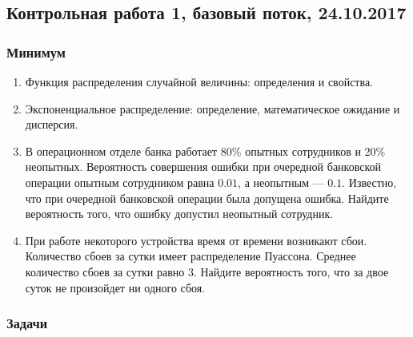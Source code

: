 \subsection{Контрольная работа 1, базовый поток, 24.10.2017}

\subsubsection*{Минимум}

\begin{enumerate}
\item Функция распределения случайной величины: определения и свойства.
\item Экспоненциальное распределение: определение, математическое ожидание и дисперсия.
\item В операционном отделе банка работает 80\% опытных сотрудников и 20\% неопытных. Вероятность совершения ошибки при очередной банковской операции опытным сотрудником равна $0.01$, а неопытным — $0.1$. Известно, что при очередной банковской операции была допущена ошибка. Найдите вероятность того, что ошибку допустил неопытный сотрудник.
\item При работе некоторого устройства время от времени возникают сбои. Количество сбоев за сутки имеет распределение Пуассона. Среднее количество сбоев за сутки равно 3. Найдите вероятность того, что за двое суток не произойдет ни одного сбоя.

\end{enumerate}

\subsubsection*{Задачи}

